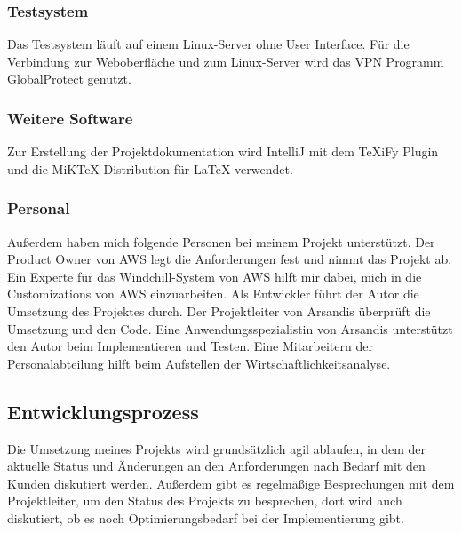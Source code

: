 \subsubsection{Testsystem}
Das Testsystem läuft auf einem Linux-Server ohne User Interface.
Für die Verbindung zur Weboberfläche und zum Linux-Server wird das VPN Programm GlobalProtect genutzt.

\subsubsection{Weitere Software}
Zur Erstellung der Projektdokumentation wird IntelliJ mit dem TeXiFy Plugin und die MiKTeX Distribution für LaTeX verwendet.

\subsubsection{Personal}
Außerdem haben mich folgende Personen bei meinem Projekt unterstützt.
Der Product Owner von \acs{AWS} legt die Anforderungen fest und nimmt das Projekt ab.
Ein Experte für das Windchill-System von \acs{AWS} hilft mir dabei, mich in die Customizations von \acs{AWS} einzuarbeiten.
Als Entwickler führt der Autor die Umsetzung des Projektes durch.
Der Projektleiter von Arsandis überprüft die Umsetzung und den Code.
Eine Anwendungsspezialistin von Arsandis unterstützt den Autor beim Implementieren und Testen.
Eine Mitarbeitern der Personalabteilung hilft beim Aufstellen der Wirtschaftlichkeitsanalyse.

\subsection{Entwicklungsprozess}
\label{sec:Entwicklungsprozess}

Die Umsetzung meines Projekts wird grundsätzlich agil ablaufen, in dem der aktuelle Status und Änderungen an den Anforderungen nach Bedarf mit den Kunden diskutiert werden.
Außerdem gibt es regelmäßige Besprechungen mit dem Projektleiter, um den Status des Projekts zu besprechen, dort wird auch diskutiert, ob es noch Optimierungsbedarf bei der Implementierung gibt.
